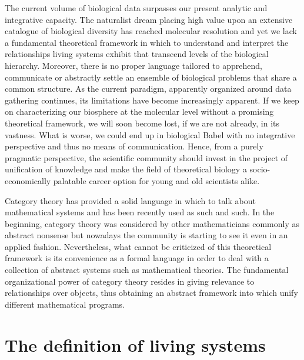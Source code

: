 \documentclass[aps,twocolumn]{revtex4-1}
\begin{document}
The current volume of biological data surpasses our present analytic and integrative capacity. The naturalist dream placing high value upon an extensive catalogue of biological diversity has reached molecular resolution and yet we lack a fundamental theoretical framework in which to understand and interpret the relationships living systems exhibit that transcend levels of the biological hierarchy. Moreover, there is no proper language tailored to apprehend, communicate or abstractly settle an ensemble of biological problems that share a common structure. As the current paradigm, apparently organized around data gathering continues, its limitations have become increasingly apparent. If we keep on characterizing our biosphere at the molecular level without a promising theoretical framework, we will soon become lost, if we are not already, in its vastness. What is worse, we could end up in biological Babel with no integrative perspective and thus no means of communication. Hence, from a purely pragmatic perspective, the scientific community should invest in the project of unification of knowledge and make the field of theoretical biology a socio-economically palatable career option for young and old scientists alike. 

Category theory has provided a solid language in which to talk about mathematical systems and has been recently used as such and such. In the beginning, category theory was considered by other mathematicians commonly as abstract nonsense but nowadays the community is starting to see it even in an applied fashion. Nevertheless, what cannot be criticized of this theoretical framework is its convenience as a formal language in order to deal with a collection of abstract systems such as mathematical theories. The fundamental organizational power of category theory resides in giving relevance to relationships over objects, thus obtaining an abstract framework into which unify different mathematical programs.

\section{The definition of living systems}
\end{document}
